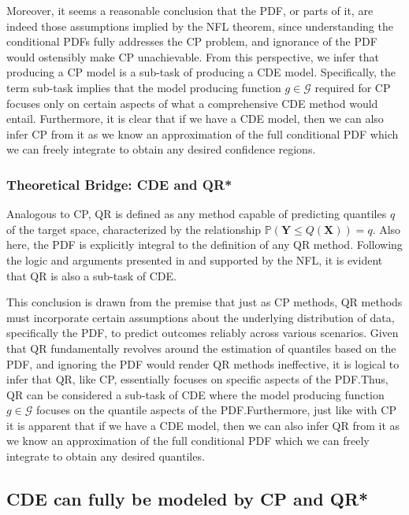 Moreover, it seems a reasonable conclusion that the PDF, or parts of it, are indeed those assumptions implied by the NFL theorem, since understanding the conditional PDFs fully addresses the CP problem, and ignorance of the PDF would ostensibly make CP unachievable. From this perspective, we infer that producing a CP model is a sub-task of producing a CDE model. Specifically, the term sub-task implies that the model producing function $g \in \mathcal{G}$ required for CP focuses only on certain aspects of what a comprehensive CDE method would entail. Furthermore, it is clear that if we have a CDE model, then we can also infer CP from it as we know an approximation of the full conditional PDF which we can freely integrate to obtain any desired confidence regions.

\subsubsection{Theoretical Bridge: CDE and QR*}\label{sec:bridge_cde_qr}

Analogous to CP, QR is defined as any method capable of predicting quantiles \( q \) of the target space, characterized by the relationship \( \mathbb{P}(\mathbf{Y} \leq Q(\mathbf{X})) = q \). Also here, the PDF is explicitly integral to the definition of any QR method. Following the logic and arguments presented in  and supported by the NFL, it is evident that QR is also a sub-task of CDE.\@

This conclusion is drawn from the premise that just as CP methods, QR methods must incorporate certain assumptions about the underlying distribution of data, specifically the PDF, to predict outcomes reliably across various scenarios. Given that QR fundamentally revolves around the estimation of quantiles based on the PDF, and ignoring the PDF would render QR methods ineffective, it is logical to infer that QR, like CP, essentially focuses on specific aspects of the PDF.\@ Thus, QR can be considered a sub-task of CDE where the model producing function \( g \in \mathcal{G} \) focuses on the quantile aspects of the PDF.\@ Furthermore, just like with CP it is apparent that if we have a CDE model, then we can also infer QR from it as we know an approximation of the full conditional PDF which we can freely integrate to obtain any desired quantiles.

\subsection{CDE can fully be modeled by CP and QR*}\label{sec:cde_sub_cp_qr}

